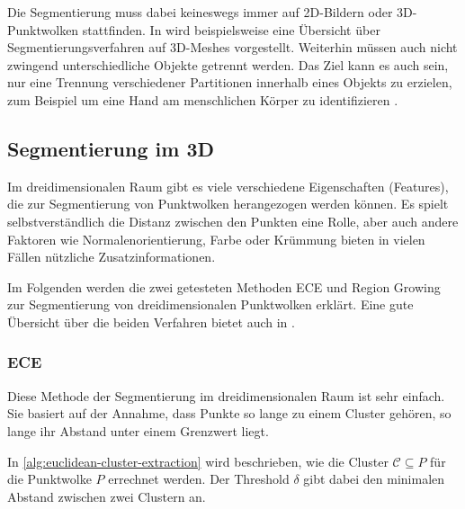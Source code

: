 Die Segmentierung muss dabei keineswegs immer auf 2D-Bildern oder 3D-Punktwolken stattfinden.
In \cite{shamir2008survey} wird beispielsweise eine Übersicht über Segmentierungsverfahren auf 3D-Meshes vorgestellt.
Weiterhin müssen auch nicht zwingend unterschiedliche Objekte getrennt werden.
Das Ziel kann es auch sein, nur eine Trennung verschiedener Partitionen innerhalb eines Objekts zu erzielen, zum Beispiel um eine Hand am menschlichen Körper zu identifizieren \cite{shapira2008consistent}.


\subsection{Segmentierung im 3D}
\label{subsec:3d-segmentation}

Im dreidimensionalen Raum gibt es viele verschiedene Eigenschaften (Features), die zur Segmentierung von Punktwolken herangezogen werden können.
Es spielt selbstverständlich die Distanz zwischen den Punkten eine Rolle, aber auch andere Faktoren wie Normalenorientierung, Farbe oder Krümmung bieten in vielen Fällen nützliche Zusatzinformationen.

Im Folgenden werden die zwei getesteten Methoden \ac{ECE} und Region Growing zur Segmentierung von dreidimensionalen Punktwolken erklärt.
Eine gute Übersicht über die beiden Verfahren bietet auch \citeauthor{RusuDoctoralDissertation} in \cite[88--93]{RusuDoctoralDissertation}.

\subsubsection{\acl{ECE}}
\label{subsubsec:euclidean-cluster-extraction}

Diese Methode der Segmentierung im dreidimensionalen Raum ist sehr einfach.
Sie basiert auf der Annahme, dass Punkte so lange zu einem Cluster gehören, so lange ihr Abstand unter einem Grenzwert liegt.

In \autoref{alg:euclidean-cluster-extraction} wird beschrieben, wie die Cluster $\mathcal{C} \subseteq P$ für die Punktwolke $P$ errechnet werden.
Der Threshold $\delta$ gibt dabei den minimalen Abstand zwischen zwei Clustern an.

